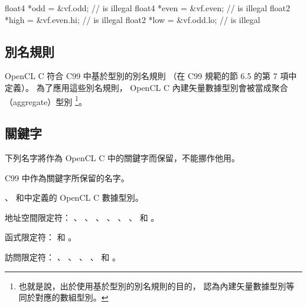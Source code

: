 float4	*odd = &vf.odd;		// is illegal
float4	*even = &vf.even;	// is illegal
float2	*high = &vf.even.hi;	// is illegal
float2	*low = &vf.odd.lo;	// is illegal
\stopclc

\subsection{別名規則}

OpenCL C  符合 C99 中基於型別的別名規則
（在 C99 規範的節 6.5 的第 7 項中定義）。
為了應用這些別名規則， OpenCL C 內建矢量數據型別會被當成聚合（aggregate）型別
\footnote{也就是說，出於使用基於型別的別名規則的目的，
認為內建矢量數據型別等同於對應的數組型別。}。

\subsection{關鍵字}

下列名字將作為 OpenCL C 中的關鍵字而保留，不能挪作他用。
\startigBase
\item C99 中作為關鍵字所保留的名字。

\item {}、
和中定義的 OpenCL C 數據型別。

\item 地址空間限定符：
 、 、 、 、
 、 、  和 。

\item 函式限定符：  和 。

\item 訪問限定符：
 、 、 、 、
  和 。
\stopigBase

